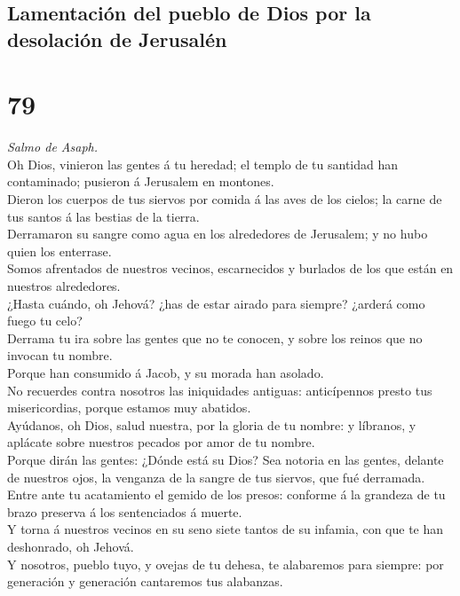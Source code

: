 \hypertarget{lamentaciuxf3n-del-pueblo-de-dios-por-la-desolaciuxf3n-de-jerusaluxe9n}{%
\subsection{Lamentación del pueblo de Dios por la desolación de
Jerusalén}\label{lamentaciuxf3n-del-pueblo-de-dios-por-la-desolaciuxf3n-de-jerusaluxe9n}}

\hypertarget{section-78}{%
\section{79}\label{section-78}}

 \emph{Salmo de Asaph.}\\
Oh Dios, vinieron las gentes á tu heredad; el templo de tu santidad han
contaminado; pusieron á Jerusalem en montones.\\
 Dieron los cuerpos de tus siervos por comida á las aves de
los cielos; la carne de tus santos á las bestias de la tierra.\\
 Derramaron su sangre como agua en los alrededores de
Jerusalem; y no hubo quien los enterrase.\\
 Somos afrentados de nuestros vecinos, escarnecidos y
burlados de los que están en nuestros alrededores.\\
 ¿Hasta cuándo, oh Jehová? ¿has de estar airado para
siempre? ¿arderá como fuego tu celo?\\
 Derrama tu ira sobre las gentes que no te conocen, y sobre
los reinos que no invocan tu nombre.\\
 Porque han consumido á Jacob, y su morada han asolado.\\
 No recuerdes contra nosotros las iniquidades antiguas:
anticípennos presto tus misericordias, porque estamos muy abatidos.\\
 Ayúdanos, oh Dios, salud nuestra, por la gloria de tu
nombre: y líbranos, y aplácate sobre nuestros pecados por amor de tu
nombre.\\
 Porque dirán las gentes: ¿Dónde está su Dios? Sea notoria
en las gentes, delante de nuestros ojos, la venganza de la sangre de tus
siervos, que fué derramada.\\
 Entre ante tu acatamiento el gemido de los presos:
conforme á la grandeza de tu brazo preserva á los sentenciados á
muerte.\\
 Y torna á nuestros vecinos en su seno siete tantos de su
infamia, con que te han deshonrado, oh Jehová.\\
 Y nosotros, pueblo tuyo, y ovejas de tu dehesa, te
alabaremos para siempre: por generación y generación cantaremos tus
alabanzas.

